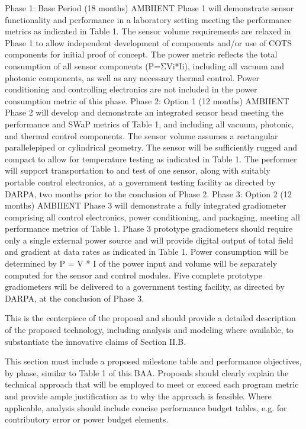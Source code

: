 Phase 1: Base Period (18 months)
AMBIIENT Phase 1 will demonstrate sensor functionality and performance in a laboratory
setting meeting the performance metrics as indicated in Table 1. The sensor volume requirements
are relaxed in Phase 1 to allow independent development of components and/or use of COTS
components for initial proof of concept. The power metric reflects the total consumption of all
sensor components (P=ΣVi*Ii), including all vacuum and photonic components, as well as any
necessary thermal control. Power conditioning and controlling electronics are not included in the
power consumption metric of this phase.
Phase 2: Option 1 (12 months)
AMBIIENT Phase 2 will develop and demonstrate an integrated sensor head meeting the
performance and SWaP metrics of Table 1, and including all vacuum, photonic, and thermal
control components. The sensor volume assumes a rectangular parallelepiped or cylindrical
geometry. The sensor will be sufficiently rugged and compact to allow for temperature testing as
indicated in Table 1. The performer will support transportation to and test of one sensor, along
with suitably portable control electronics, at a government testing facility as directed by
DARPA, two months prior to the conclusion of Phase 2.
Phase 3: Option 2 (12 months)
AMBIIENT Phase 3 will demonstrate a fully integrated gradiometer comprising all control
electronics, power conditioning, and packaging, meeting all performance metrics of Table 1.
Phase 3 prototype gradiometers should require only a single external power source and will
provide digital output of total field and gradient at data rates as indicated in Table 1. Power
consumption will be determined by P = V * I of the power input and volume will be separately
computed for the sensor and control modules. Five complete prototype gradiometers will be
delivered to a government testing facility, as directed by DARPA, at the conclusion of Phase 3.


This is the centerpiece of the proposal and should provide a detailed description of the
proposed technology, including analysis and modeling where available, to substantiate the
innovative claims of Section II.B.

This section must include a proposed milestone table and
performance objectives, by phase, similar to Table 1 of this BAA. Proposals should clearly
explain the technical approach that will be employed to meet or exceed each program metric
and provide ample justification as to why the approach is feasible. Where applicable, analysis
should include concise performance budget tables, e.g. for contributory error or power
budget elements.

